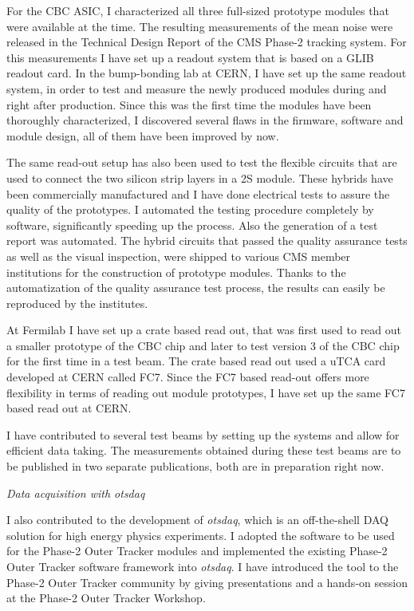 \documentclass[]{cv} %
\begin{document}
\begin{statement}
For the CBC ASIC, I characterized all three full-sized prototype modules that
were available at the time. The resulting measurements of the mean noise were
released in the Technical Design Report of the CMS Phase-2 tracking system. For
this measurements I have set up a readout system that is based on a GLIB readout
card. In the bump-bonding lab at CERN, I have set up the same readout system, in
order to test and measure the newly produced modules during and right after
production. Since this was the first time the modules have been thoroughly
characterized, I discovered several flaws in the firmware, software and module
design, all of them have been improved by now.

The same read-out setup has also been used to test the flexible circuits that
are used to connect the two silicon strip layers in a 2S module. These hybrids
have been commercially manufactured and I have done electrical tests to assure
the quality of the prototypes. I automated the testing procedure completely by
software, significantly speeding up the process. Also the generation of a test
report was automated. The hybrid circuits that passed the quality assurance
tests as well as the visual inspection, were shipped to various CMS member
institutions for the construction of prototype modules. Thanks to the
automatization of the quality assurance test process, the results can easily be
reproduced by the institutes.

At Fermilab I have set up a crate based read out, that was first used to read
out a smaller prototype of the CBC chip and later to test version 3 of the CBC
chip for the first time in a test beam. The crate based read out used a uTCA
card developed at CERN called FC7. Since the FC7 based read-out offers more
flexibility in terms of reading out module prototypes, I have set up the same
FC7 based read out at CERN.

I have contributed to several test beams by setting up the systems and allow for
efficient data taking. The measurements obtained during these test beams are to
be published in two separate publications, both are in preparation right now.

\vspace{15pt}
\Large{}
\textit{Data acquisition with \textit{otsdaq}}
\normalsize{}

I also contributed to the development of \textit{otsdaq}, which is an
off-the-shell DAQ solution for high energy physics experiments. I adopted the
software to be used for the Phase-2 Outer Tracker modules and implemented the
existing Phase-2 Outer Tracker software framework into \textit{otsdaq}. I have
introduced the tool to the Phase-2 Outer Tracker community by giving
presentations and a hands-on session at the Phase-2 Outer Tracker Workshop.


\end{statement}
\end{document}
